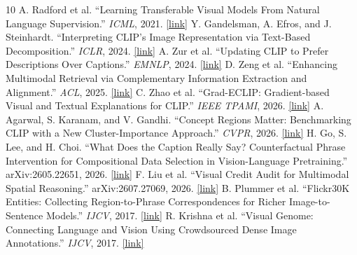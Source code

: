 \documentclass[10pt,twocolumn]{article}
\begin{document}
\balance
\vspace{0.5mm}
{\footnotesize
\begin{thebibliography}{10}
\setlength{\itemsep}{0.5pt}
 A. Radford et al. ``Learning Transferable Visual Models From Natural Language Supervision.'' \emph{ICML}, 2021. \href{https://proceedings.mlr.press/v139/radford21a.html}{[link]}
 Y. Gandelsman, A. Efros, and J. Steinhardt. ``Interpreting CLIP's Image Representation via Text-Based Decomposition.'' \emph{ICLR}, 2024. \href{https://proceedings.iclr.cc/paper_files/paper/2024/hash/5085a2b8c298edeadc46b9ffe6df5f64-Abstract-Conference.html}{[link]}
 A. Zur et al. ``Updating CLIP to Prefer Descriptions Over Captions.'' \emph{EMNLP}, 2024. \href{https://aclanthology.org/2024.emnlp-main.1125/}{[link]}
 D. Zeng et al. ``Enhancing Multimodal Retrieval via Complementary Information Extraction and Alignment.'' \emph{ACL}, 2025. \href{https://aclanthology.org/2025.acl-long.1073/}{[link]}
 C. Zhao et al. ``Grad-ECLIP: Gradient-based Visual and Textual Explanations for CLIP.'' \emph{IEEE TPAMI}, 2026. \href{https://doi.org/10.1109/TPAMI.2026.3714444}{[link]}
 A. Agarwal, S. Karanam, and V. Gandhi. ``Concept Regions Matter: Benchmarking CLIP with a New Cluster-Importance Approach.'' \emph{CVPR}, 2026. \href{https://openaccess.thecvf.com/content/CVPR2026/html/Agarwal_Concept_Regions_Matter_Benchmarking_CLIP_with_a_New_Cluster-Importance_Approach_CVPR_2026_paper.html}{[link]}
 H. Go, S. Lee, and H. Choi. ``What Does the Caption Really Say? Counterfactual Phrase Intervention for Compositional Data Selection in Vision-Language Pretraining.'' arXiv:2605.22651, 2026. \href{https://arxiv.org/abs/2605.22651}{[link]}
 F. Liu et al. ``Visual Credit Audit for Multimodal Spatial Reasoning.'' arXiv:2607.27069, 2026. \href{https://arxiv.org/abs/2607.27069}{[link]}
 B. Plummer et al. ``Flickr30K Entities: Collecting Region-to-Phrase Correspondences for Richer Image-to-Sentence Models.'' \emph{IJCV}, 2017. \href{https://arxiv.org/abs/1505.04870}{[link]}
 R. Krishna et al. ``Visual Genome: Connecting Language and Vision Using Crowdsourced Dense Image Annotations.'' \emph{IJCV}, 2017. \href{https://link.springer.com/article/10.1007/s11263-016-0981-7}{[link]}
\end{thebibliography}
}
\end{document}
